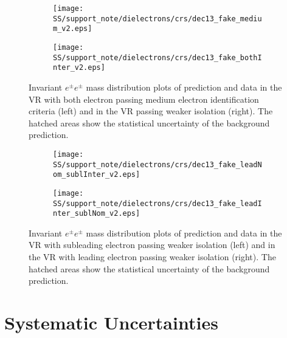 \begin{figure}
\begin{subfigure}{.5\textwidth}
  \centering
  \texttt{[image: SS/support\_note/dielectrons/crs/dec13\_fake\_medium\_v2.eps]}
\end{subfigure}%
\begin{subfigure}{.5\textwidth}
  \centering
  \texttt{[image: SS/support\_note/dielectrons/crs/dec13\_fake\_bothInter\_v2.eps]}
\end{subfigure}
\caption{
Invariant $e^{\pm}e^{\pm}$ mass distribution
plots of prediction and data in the VR with both electron passing medium electron identification criteria (left) and in the VR passing weaker isolation (right).
The hatched areas show the statistical uncertainty of the background prediction.
}
  \label{fig:fakeCR_part1}
\end{figure}

\begin{figure}
\begin{subfigure}{.5\textwidth}
  \centering
  \texttt{[image: SS/support\_note/dielectrons/crs/dec13\_fake\_leadNom\_sublInter\_v2.eps]}
\end{subfigure}%
\begin{subfigure}{.5\textwidth}
  \centering
  \texttt{[image: SS/support\_note/dielectrons/crs/dec13\_fake\_leadInter\_sublNom\_v2.eps]}
\end{subfigure}
\caption{
Invariant $e^{\pm}e^{\pm}$ mass distribution
plots of prediction and data in the VR with subleading electron passing weaker isolation (left) and in the VR with leading electron passing weaker isolation (right).
The hatched areas show the statistical uncertainty of the background prediction.
}
  \label{fig:fakeCR_part2}
\end{figure}



\section{Systematic Uncertainties}
\label{sec:ss_Systematics}

